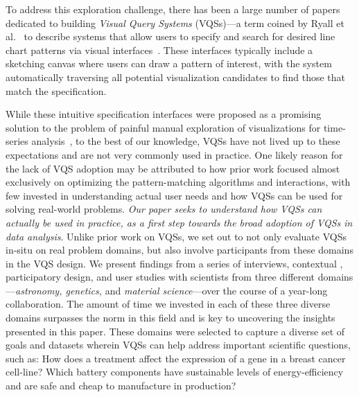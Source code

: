  To address this exploration challenge, there has been a large number of papers dedicated to building \emph{Visual Query Systems} (VQSs)---a term coined by Ryall et al.~\cite{ryall2005querylines} to describe systems that allow users to specify and search for desired line chart patterns via visual interfaces~\cite{mohebbi2011google,Hochheiser2004,wattenberg2001sketching,Siddiqui2017VLDB,ryall2005querylines,correll2016semantics,Mannino2018,Eichmann2015,Holz2009}. %
 These interfaces typically include a sketching canvas where users can draw a pattern of interest, with the system automatically traversing all potential visualization candidates to find those that match the specification. 
 \par While these intuitive specification interfaces were proposed as a promising solution to the problem of painful manual exploration of visualizations for time-series analysis~\cite{ryall2005querylines,wattenberg2001sketching}, to the best of our knowledge, VQSs have not lived up to these expectations and are not very commonly used in practice. One likely reason for the lack of VQS adoption may be attributed to how prior work  focused almost exclusively on optimizing the pattern-matching algorithms and interactions, with few invested in understanding actual user needs and how VQSs can be used for solving real-world problems. {\em Our paper seeks to understand how VQSs can actually be used in practice, as a first step towards the broad adoption of VQSs in data analysis}. Unlike prior work on VQSs, we set out to not only evaluate VQSs in-situ on real problem domains, but also involve participants from these domains in the VQS design. We present findings from a series of interviews, contextual , participatory design, and user studies with scientists from three different domains---{\em astronomy, genetics,} and {\em material science}---over the course of a year-long collaboration. The amount of time we invested in each of these three diverse domains surpasses the norm in this field and is key to uncovering the insights presented in this paper. These domains were selected to capture a diverse set of goals and datasets wherein VQSs can help address important scientific questions, such as: How does a treatment affect the expression of a gene in a breast cancer cell-line? Which battery components have sustainable levels of energy-efficiency and are safe and cheap to manufacture in production?
